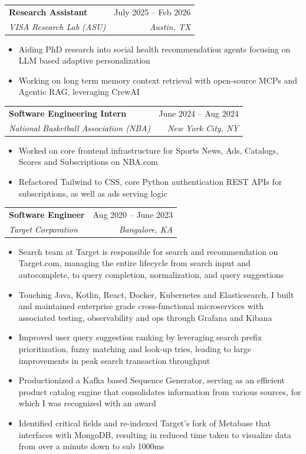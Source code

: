 \documentclass[letterpaper,11pt]{article}
\makeatletter
\newcommand{\resumeItem}[1]{
  \item\small{
    {#1 \vspace{-1pt}}
  }
}
\newcommand{\resumeSubheading}[4]{
  \vspace{-2pt}\item
    \begin{tabular*}{0.97\textwidth}[t]{l@{\extracolsep{\fill}}r}
      \textbf{#1} & #2 \\
      \textit{\small#3} & \textit{\small #4} \\
    \end{tabular*}\vspace{-7pt}
}
\newcommand{\resumeSubSubheading}[2]{
    \item
    \begin{tabular*}{0.97\textwidth}{l@{\extracolsep{\fill}}r}
      \textit{\small#1} & \textit{\small #2} \\
    \end{tabular*}\vspace{-7pt}
}
\newcommand{\resumeSubHeadingListEnd}{\end{itemize}}
\newcommand{\resumeItemListStart}{\begin{itemize}}
\newcommand{\resumeItemListEnd}{\end{itemize}\vspace{-5pt}}
\makeatother
\begin{document}
      \resumeSubheading
      {Research Assistant}{July 2025 -- Feb 2026}
      {VISA Research Lab (ASU)}{Austin, TX}
      \resumeItemListStart
        \resumeItem{Aiding PhD research into social health recommendation agents focusing on LLM based adaptive personalization}
        \resumeItem{Working on long term memory context retrieval with open-source MCPs and Agentic RAG, leveraging CrewAI}
      \resumeItemListEnd

      \resumeSubheading
      {Software Engineering Intern}{June 2024 -- Aug 2024}
      {National Basketball Association (NBA)}{New York City, NY}
      \resumeItemListStart
        \resumeItem{Worked on core frontend infrastructure for Sports News, Ads, Catalogs, Scores and Subscriptions on NBA.com}
        \resumeItem{Refactored Tailwind to CSS, core Python authentication REST APIs for subscriptions, as well as ads serving logic}
      \resumeItemListEnd

    \resumeSubheading
      {Software Engineer}{Aug 2020 -- June 2023}
      {Target Corporation}{Bangalore, KA}
      \resumeItemListStart
        \resumeItem{Search team at Target is responsible for search and recommendation on Target.com, managing the entire lifecycle from search input and autocomplete, to query completion, normalization, and query suggestions}
        \resumeItem{Touching Java, Kotlin, React, Docker, Kubernetes and Elasticsearch, I built and maintained enterprise grade cross-functional microservices with associated testing, observability and ops through Grafana and Kibana}
        \resumeItem{Improved user query suggestion ranking by leveraging search prefix prioritization, fuzzy matching and look-up tries, leading to large improvements in peak search transaction throughput}
        \resumeItem{Productionized a Kafka based Sequence Generator, serving as an efficient product catalog engine that consolidates information from various sources, for which I was recognized with an award}
        \resumeItem{Identified critical fields and re-indexed Target’s fork of Metabase that interfaces with MongoDB, resulting in reduced time taken to visualize data from over a minute down to sub 1000ms}
      \resumeItemListEnd


\end{document}

